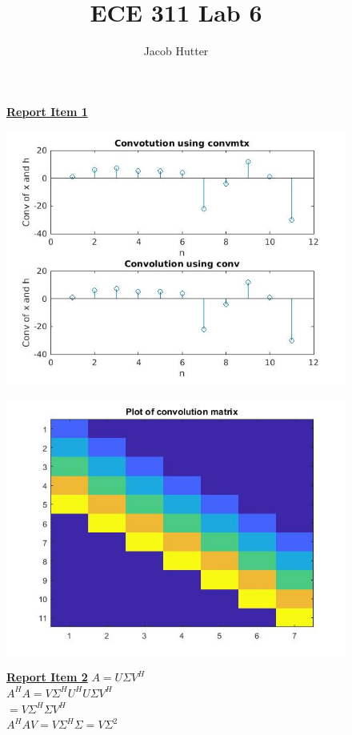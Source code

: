 \documentclass{article}
\author{Jacob Hutter}
\title{ECE 311 Lab 6}
\begin{document}
\maketitle

\begin{figure}[H]
\color{red}
\underline{\textbf{Report Item 1}}
\color{black}

\includegraphics[scale=.5]{report1_1}
\end{figure}

\begin{figure}[H]
\includegraphics[scale=.5]{report1_2}
\end{figure}

\begin{figure}[H]
\color{red}
\underline{\textbf{Report Item 2}}
\color{black}
$A = U \Sigma V^H $
\\$A^HA = V\Sigma^HU^HU \Sigma V^H $
\\$= V \Sigma^H \Sigma V^H$
\\ $A^HAV= V \Sigma^H \Sigma = V \Sigma^2$
\end{figure}
\end{document}
